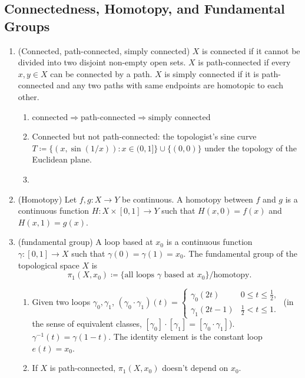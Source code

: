 \subsection{Connectedness, Homotopy, and Fundamental Groups}
\begin{enumerate}
    \item (Connected, path-connected, simply connected) $X$ is connected if it cannot be divided into two disjoint non-empty open sets. $X$ is path-connected if every $x,y\in X$ can be connected by a path. $X$ is simply connected if it is path-connected and any two paths with same endpoints are homotopic to each other.
    \begin{enumerate}
        \item $\text{connected} \Rightarrow \text{path-connected} \Rightarrow \text{simply connected}$
        \item Connected but not path-connected: the topologist's sine curve $T \coloneqq \{ (x, \sin(1/x)): x\in (0,1] \} \cup \{(0,0)\}$ under the topology of the Euclidean plane.
        \item 
    \end{enumerate}
    \item (Homotopy) Let $f,g: X \to Y$ be continuous. A homotopy between $f$ and $g$ is a continuous function $H:X \times [0,1] \to Y$ such that $H(x,0)=f(x)$ and $H(x,1)=g(x)$. 
    \item (fundamental group) A loop based at $x_0$ is a continuous function $\gamma: [0,1]\to X$ such that $\gamma(0)=\gamma(1)=x_0$. The fundamental group of the topological space $X$ is
    \[ \pi_1(X, x_0) \coloneqq \{ \text{all~loops~$\gamma$~based at $x_0$} \} / \text{homotopy}. \]
    \begin{enumerate}
        \item Given two loops $\gamma_0, \gamma_1$, 
        \( (\gamma_0 \cdot \gamma_1)(t) = \begin{cases}
            \gamma_0(2t) & 0 \le t \le \frac{1}{2}, \\
            \gamma_1(2t-1) & \frac{1}{2} < t \le 1.
        \end{cases}  \) (in the sense of equivalent classes, $[\gamma_0] \cdot [\gamma_1]=[\gamma_0 \cdot \gamma_1]$). $\gamma^{-1}(t)=\gamma(1-t)$. The identity element is the constant loop $e(t)=x_0$.
        \item If $X$ is path-connected, $\pi_1(X,x_0)$ doesn't depend on $x_0$.
    \end{enumerate}
\end{enumerate}
